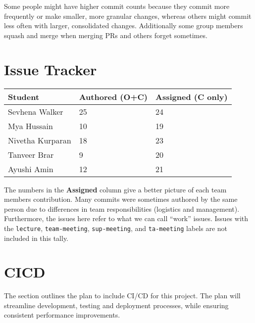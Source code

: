 \documentclass{article}
\begin{document}
Some people might have higher commit counts because they commit more frequently or make smaller, more granular changes, whereas others might commit less often with larger, consolidated changes. Additionally some group members squash and merge when merging PRs and others forget sometimes.


\section{Issue Tracker}


\begin{table}[H]
\centering
\begin{tabular}{lll}
\toprule
\textbf{Student} & \textbf{Authored (O+C)} & \textbf{Assigned (C only)}\\
\midrule
Sevhena Walker & 25 & 24 \\
Mya Hussain & 10 & 19 \\
Nivetha Kurparan & 18 & 23 \\
Tanveer Brar & 9 & 20 \\
Ayushi Amin & 12 & 21 \\
\bottomrule
\end{tabular}
\end{table}

The numbers in the \textbf{Assigned} column give a better picture of each team members contribution. Many commits were sometimes authored by the same person due to differences in team responsibilities (logistics and management). Furthermore, the issues here refer to what we can call ``work'' issues. Issues with the \texttt{lecture}, \texttt{team-meeting}, \texttt{sup-meeting}, and \texttt{ta-meeting} labels are not included in this tally.

\section{CICD}

The section outlines the plan to include CI/CD for this project. The plan will streamline development, testing and deployment processes, while ensuring consistent performance improvements.
\end{document}
